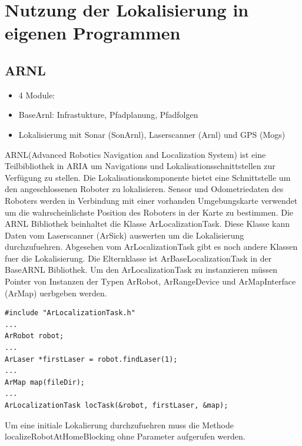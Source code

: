 \documentclass{article}
\begin{document}
\section{Nutzung der Lokalisierung in eigenen Programmen}

\subsection{ARNL}
\begin{itemize}
\item 4 Module:
\item BaseArnl: Infrastukture, Pfadplanung, Pfadfolgen
\item Lokalisierung mit Sonar (SonArnl), Laserscanner (Arnl) und GPS (Mogs)
\end{itemize}
ARNL(Advanced Robotics Navigation and Localization System) ist eine Teilbibliothek in ARIA um Navigations und Lokalisationsschnittstellen zur Verf\"ugung zu stellen. Die Lokalisationskomponente bietet eine Schnittstelle um den angeschlossenen Roboter zu lokalisieren. Sensor und Odometriedaten des Roboters werden in Verbindung mit einer vorhanden Umgebungskarte verwendet um die wahrscheinlichste Position des Roboters in der Karte zu bestimmen. \cite{arnl} 
Die ARNL Bibliothek beinhaltet die Klasse ArLocalizationTask. Diese Klasse kann Daten vom Laserscanner (ArSick) auswerten um die Lokalisierung durchzufuehren. Abgesehen vom ArLocalizationTask gibt es noch andere Klassen fuer die Lokalisierung. Die Elternklasse ist ArBaseLocalizationTask in der BaseARNL Bibliothek. \cite{arnl}
Um den ArLocalizationTask zu instanzieren m\"ussen Pointer von Instanzen der Typen ArRobot, ArRangeDevice und ArMapInterface (ArMap) uerbgeben werden.
\lstset{language=C++}
\begin{lstlisting}
#include "ArLocalizationTask.h"
...
ArRobot robot;
...
ArLaser *firstLaser = robot.findLaser(1);
...
ArMap map(fileDir);
...
ArLocalizationTask locTask(&robot, firstLaser, &map);
\end{lstlisting}
Um eine initiale Lokalierung durchzufuehren muss die Methode localizeRobotAtHomeBlocking ohne Parameter aufgerufen werden.
\end{document}
